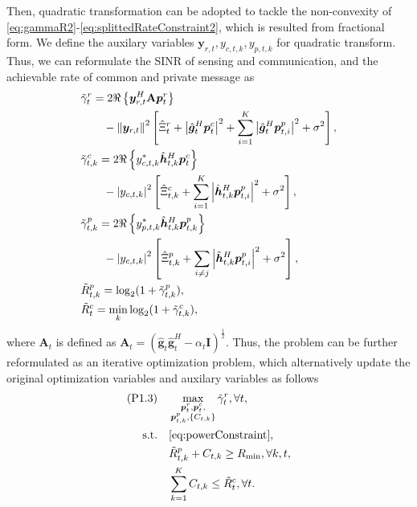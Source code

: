 \documentclass[twocolumn,journal]{IEEEtran}
\begin{document}
Then, quadratic transformation \cite{shenFractional2018a} can be adopted to tackle the non-convexity of \eqref{eq:gammaR2}-\eqref{eq:splittedRateConstraint2}, which is resulted from fractional form. We define the auxilary variables \(\boldsymbol{y}_{r,t},y_{c,t,k},y_{p,t,k}\) for quadratic transform. Thus, we can reformulate the SINR of sensing and communication, and the achievable rate of common and private message as
\begin{subequations}
\begin{align}
    &\tilde{\gamma}_{t}^{r}=2\Re\left\{\boldsymbol{y}_{r,t}^H\mathbf{A}\boldsymbol{p}^{r}_{t}\right\}\notag\\
    &\qquad-\left\Vert \boldsymbol{y}_{r,t}\right\Vert^2 \left[\hat{\Xi}^{r}_{t} + \left| \hat{\boldsymbol{g}}^{H}_{t}\boldsymbol{p}^{c}_{t}\right|^2 + \sum_{i=1}^{K}\left| \hat{\boldsymbol{g}}^{H}_{t}\boldsymbol{p}^{p}_{t,i}\right|^2 + \sigma^2\right],\\
    &\tilde{\gamma}_{t,k}^{c}=2\Re\left\{ y_{c,t,k}^{*}\hat{\boldsymbol{h}}^{H}_{t,k}\boldsymbol{p}^{c}_{t} \right\}\notag\\ 
    &\qquad- \left\vert y_{c,t,k} \right\vert^2\left[ \hat{\Xi}^{c}_{t,k} +  \sum_{i=1}^{K}\left| \hat{\boldsymbol{h}}^{H}_{t,k}\boldsymbol{p}^{p}_{t,i}\right|^2 + \sigma^2 \right],\\
    &\tilde{\gamma}_{t,k}^{p}=2\Re\left\{ y_{p,t,k}^{*}\hat{\boldsymbol{h}}^{H}_{t,k}\boldsymbol{p}^{p}_{t,k} \right\}\notag\\ 
    &\qquad- \left\vert y_{c,t,k} \right\vert^2\left[ \hat{\Xi}^{p}_{t,k} +  \sum_{i\neq j}\left| \hat{\boldsymbol{h}}^{H}_{t,k}\boldsymbol{p}^{p}_{t,i}\right|^2 + \sigma^2 \right],\\
    &\tilde{R}^{p}_{t,k} = \log_2(1+\tilde{\gamma}_{t,k}^{p}),\\
    &\tilde{R}^{c}_{t} =  \min_{k}\log_2(1+\tilde{\gamma}_{t,k}^{c}),
\end{align}
\end{subequations}
where \(\mathbf{A}_t\) is defined as \(\mathbf{A}_t = \left(\hat{\boldsymbol{g}}_{t}\hat{\boldsymbol{g}}^{H}_{t}-\alpha_t\mathbf{I}\right)^{\frac{1}{2}}\). Thus, the problem can be further reformulated as an iterative optimization problem, which alternatively update the original optimization variables and auxilary variables as follows
\begin{subequations}
\begin{align}
    (\text{P1.3})\quad&\mathop{\max}_{{\substack{\boldsymbol{p}^{r}_{t},\boldsymbol{p}^{c}_{t},\\
    \boldsymbol{p}^{p}_{t,k},\left\{C_{t,k}\right\}}}}\tilde{\gamma}_{t}^{r}, \forall t,\label{eq:gammaRQT}\\
    \text{s.t.}\quad&\eqref{eq:powerConstraint},\notag\\
    \quad&\tilde{R}^{p}_{t,k} + C_{t,k} \geq R_{\min}, \forall k,t,\label{eq:rateConstraintQT}\\
    & \sum_{k=1}^{K} C_{t,k} \leq \tilde{R}^{c}_{t}, \forall t. \label{eq:splittedRateConstraintQT}
\end{align}
\end{subequations}
\end{document}
